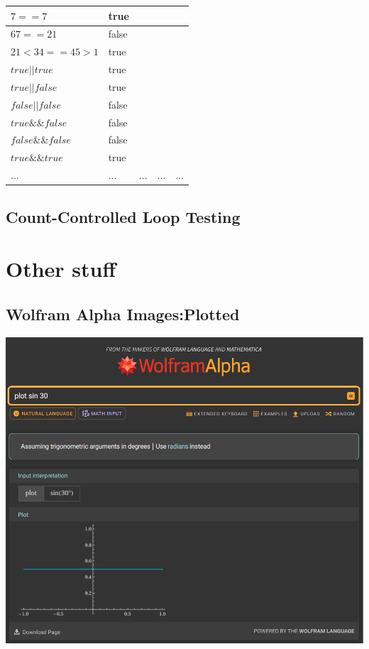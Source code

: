\documentclass[a4paper, oneside, 11pt]{report}
\begin{document}
\begin{table}
\begin{tabular}{|l|l|l|l|l|}
\hline
$7 == 7$         & true  &      &           &                 \\ 
\hline
$67 == 21$       & false &      &           &                 \\ 
\hline
$21<34 == 45>1$  & true  &      &           &                 \\ 
\hline
$true || true$   & true  &      &           &                 \\ 
\hline
$true || false$  & true  &      &           &                 \\ 
\hline
$false || false$ & false &      &           &                 \\ 
\hline
$true \&\& false$  & false &      &           &                 \\ 
\hline
$false \&\& false$ & false &      &           &                 \\ 
\hline
$true \&\& true$   & true  &      &           &                 \\ 
\hline
...              & ...   & ...  & ...       & ...             \\
\hline
\end{tabular}
\end{table}

\section{Count-Controlled Loop Testing}\label{CounTConTest}

\chapter{Other stuff}
\section{Wolfram Alpha Images:Plotted} \label{WolframPlotted}

\includegraphics[width=160mm]{Screenshot 2025-01-03 161746.png} \\
\end{document}
